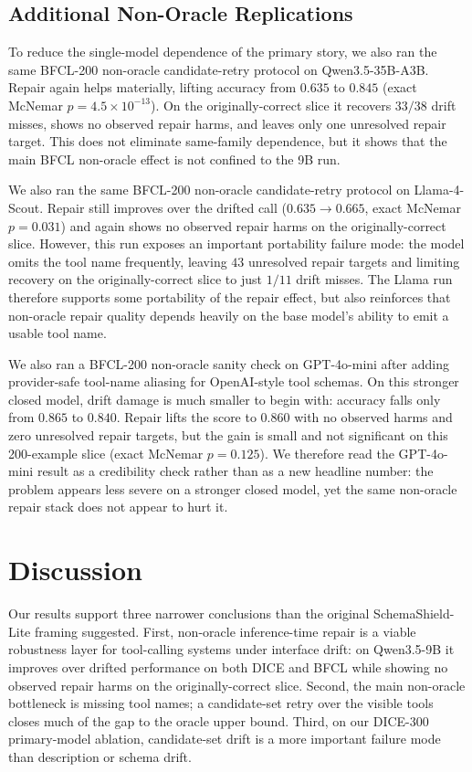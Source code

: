 \documentclass[runningheads]{llncs}
\newcommand{\method}{SchemaShield-Lite\xspace}
\begin{document}
\subsection{Additional Non-Oracle Replications}
\label{sec:additional-replications}
To reduce the single-model dependence of the primary story, we also ran the same
BFCL-200 non-oracle candidate-retry protocol on Qwen3.5-35B-A3B. Repair again
helps materially, lifting accuracy from $0.635$ to $0.845$ (exact McNemar
$p=4.5\times 10^{-13}$). On the originally-correct slice it recovers $33/38$
drift misses, shows no observed repair harms, and leaves only one unresolved
repair target. This does not eliminate same-family dependence, but it shows that
the main BFCL non-oracle effect is not confined to the 9B run.

We also ran the same BFCL-200 non-oracle candidate-retry protocol on
Llama-4-Scout. Repair still improves over the drifted call ($0.635 \rightarrow
0.665$, exact McNemar $p=0.031$) and again shows no observed repair harms on the
originally-correct slice. However, this run exposes an important portability
failure mode: the model omits the tool name frequently, leaving $43$ unresolved
repair targets and limiting recovery on the originally-correct slice to just
$1/11$ drift misses. The Llama run therefore supports some portability of the
repair effect, but also reinforces that non-oracle repair quality depends heavily
on the base model's ability to emit a usable tool name.

We also ran a BFCL-200 non-oracle sanity check on GPT-4o-mini after adding
provider-safe tool-name aliasing for OpenAI-style tool schemas. On this stronger
closed model, drift damage is much smaller to begin with: accuracy falls only from
$0.865$ to $0.840$. Repair lifts the score to $0.860$ with no observed harms and
zero unresolved repair targets, but the gain is small and not significant on this
200-example slice (exact McNemar $p=0.125$). We therefore read the GPT-4o-mini
result as a credibility check rather than as a new headline number: the problem
appears less severe on a stronger closed model, yet the same non-oracle repair
stack does not appear to hurt it.

\section{Discussion}
Our results support three narrower conclusions than the original \method framing
suggested. First, non-oracle inference-time repair is a viable robustness layer for
tool-calling systems under interface drift: on Qwen3.5-9B it improves over drifted
performance on both DICE and BFCL while showing no observed repair harms on the
originally-correct slice. Second, the main non-oracle bottleneck is missing tool
names; a candidate-set retry over the visible tools closes much of the gap to the
oracle upper bound. Third, on our DICE-300 primary-model ablation, candidate-set
drift is a more important failure mode than description or schema drift.
\end{document}
